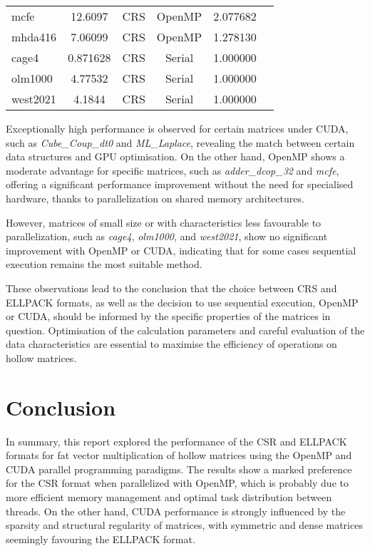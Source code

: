 \documentclass[12pt,oneside]{book} %
\begin{document}
\begin{longtable}{lccccr}
    mcfe              & 12.6097                   & CRS                     & OpenMP               & 2.077682         \\
    mhda416           & 7.06099                   & CRS                     & OpenMP               & 1.278130         \\
    cage4             & 0.871628                  & CRS                     & Serial               & 1.000000         \\
    olm1000           & 4.77532                   & CRS                     & Serial               & 1.000000         \\
    west2021          & 4.1844                    & CRS                     & Serial               & 1.000000         \\
\end{longtable}

Exceptionally high performance is observed for certain matrices under CUDA,
such as \textit{Cube\_Coup\_dt0} and \textit{ML\_Laplace}, revealing the match
between certain data structures and GPU optimisation. On the other hand, OpenMP
shows a moderate advantage for specific matrices, such as
\textit{adder\_dcop\_32} and \textit{mcfe}, offering a significant performance
improvement without the need for specialised hardware, thanks to
parallelization on shared memory architectures.

However, matrices of small size or with characteristics less favourable to
parallelization, such as \textit{cage4}, \textit{olm1000}, and
\textit{west2021}, show no significant improvement with OpenMP or CUDA,
indicating that for some cases sequential execution remains the most suitable
method.

These observations lead to the conclusion that the choice between CRS and
ELLPACK formats, as well as the decision to use sequential execution, OpenMP or
CUDA, should be informed by the specific properties of the matrices in
question. Optimisation of the calculation parameters and careful evaluation of
the data characteristics are essential to maximise the efficiency of operations
on hollow matrices.

\chapter{Conclusion}

In summary, this report explored the performance of the CSR and ELLPACK formats
for fat vector multiplication of hollow matrices using the OpenMP and CUDA
parallel programming paradigms. The results show a marked preference for the
CSR format when parallelized with OpenMP, which is probably due to more
efficient memory management and optimal task distribution between threads. On
the other hand, CUDA performance is strongly influenced by the sparsity and
structural regularity of matrices, with symmetric and dense matrices seemingly
favouring the ELLPACK format.
\end{document}
